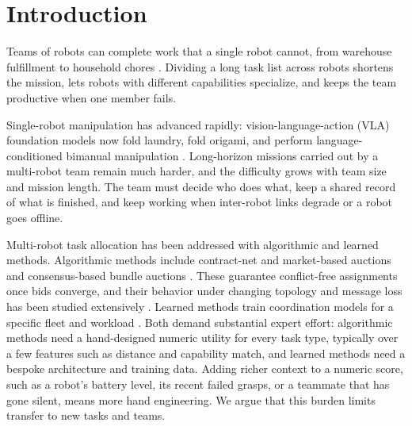 \documentclass[letterpaper]{article}
\begin{document}
\begin{abstract}
We hypothesize the following. First, LLM-only teams degrade as the number of tasks, task difficulty, and team size grow, through duplicated, orphaned, and conflicting work, while auction-based teams do not. Second, LLM utilities achieve higher utility relative to the oracle than numeric utilities, at a measurable token cost. Third, under packet loss, reduced range, and agent churn, LLM-utility auctions degrade less and recover faster than numeric auctions, beyond what the replicated ledger alone provides.
\end{abstract}

\section{Introduction}

Teams of robots can complete work that a single robot cannot, from warehouse fulfillment \citep{agaskar2025deepfleet} to household chores \citep{chang2025partnr}. Dividing a long task list across robots shortens the mission, lets robots with different capabilities specialize, and keeps the team productive when one member fails.

Single-robot manipulation has advanced rapidly: vision-language-action (VLA) foundation models now fold laundry, fold origami, and perform language-conditioned bimanual manipulation \citep{black2025pi0, gemini2025robotics, nvidia2025gr00t}. Long-horizon missions carried out by a multi-robot team remain much harder, and the difficulty grows with team size and mission length. The team must decide who does what, keep a shared record of what is finished, and keep working when inter-robot links degrade or a robot goes offline.

Multi-robot task allocation has been addressed with algorithmic and learned methods. Algorithmic methods include contract-net and market-based auctions \citep{smith1980contract, dias2000free, dias2004traderbots, gerkey2002sold} and consensus-based bundle auctions \citep{choi2009cbba, johnson2011acbba}. These guarantee conflict-free assignments once bids converge, and their behavior under changing topology and message loss has been studied extensively \citep{ponda2010dynamic, otte2020auctions, degradedmrta2026}. Learned methods train coordination models for a specific fleet and workload \citep{wang2020gatsched, agaskar2025deepfleet}. Both demand substantial expert effort: algorithmic methods need a hand-designed numeric utility for every task type, typically over a few features such as distance and capability match, and learned methods need a bespoke architecture and training data. Adding richer context to a numeric score, such as a robot's battery level, its recent failed grasps, or a teammate that has gone silent, means more hand engineering. We argue that this burden limits transfer to new tasks and teams.
\end{document}

